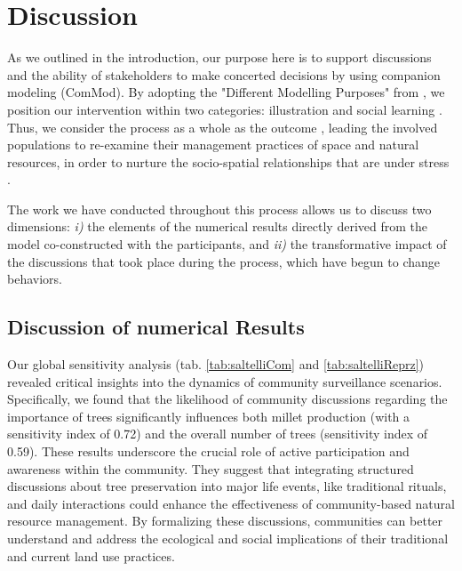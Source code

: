 \documentclass{article}
\begin{document}
\section{Discussion}

As we outlined in the introduction, our purpose here is to support discussions and the ability of stakeholders to make concerted decisions by using companion modeling (ComMod). By adopting the "Different Modelling Purposes" from \parencite{edmonds_different_2019}, we position our intervention within two categories: illustration and social learning \parencite{sukthankar_kilt_2017}. Thus, we consider the process as a whole as the outcome \parencite{etienne_companion_2014}, leading the involved populations to re-examine their management practices of space and natural resources, in order to nurture the socio-spatial relationships that are under stress \parencite{selfa_politics_2008}.

The work we have conducted throughout this process allows us to discuss two dimensions: \textit{i)} the elements of the numerical results directly derived from the model co-constructed with the participants, and \textit{ii)} the transformative impact of the discussions that took place during the process, which have begun to change behaviors.

\subsection{Discussion of numerical Results}

Our global sensitivity analysis (tab. \ref{tab:saltelliCom} and \ref{tab:saltelliReprz}) revealed critical insights into the dynamics of community surveillance scenarios. Specifically, we found that the likelihood of community discussions regarding the importance of trees significantly influences both millet production (with a sensitivity index of 0.72) and the overall number of trees (sensitivity index of 0.59). These results underscore the crucial role of active participation and awareness within the community. They suggest that integrating structured discussions about tree preservation into major life events, like traditional rituals, and daily interactions could enhance the effectiveness of community-based natural resource management. By formalizing these discussions, communities can better understand and address the ecological and social implications of their traditional and current land use practices.\\
\end{document}
